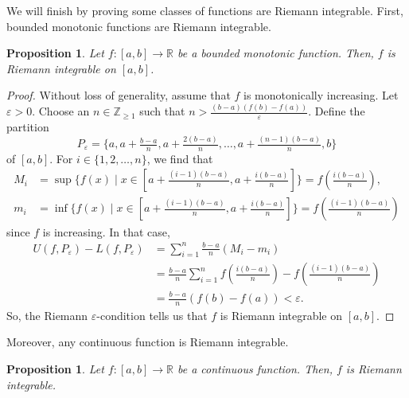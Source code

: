 \documentclass[a4paper, openany]{memoir}
\theoremstyle{definition}
\theoremstyle{plain}
\newtheorem{proposition}[definition]{Proposition}
\begin{document}
We will finish by proving some classes of functions are Riemann integrable. First, bounded monotonic functions are Riemann integrable.
\begin{proposition}
Let $f: [a, b] \to \mathbb{R}$ be a bounded monotonic function. Then, $f$ is Riemann integrable on $[a, b]$.
\end{proposition}
\begin{proof}
Without loss of generality, assume that $f$ is monotonically increasing. Let $\varepsilon > 0$. Choose an $n \in \mathbb{Z}_{\geqslant 1}$ such that $n > \frac{(b-a)(f(b) - f(a))}{\varepsilon}$. Define the partition
\[P_\varepsilon = \{a, a + \tfrac{b-a}{n}, a + \tfrac{2(b-a)}{n}, \dots, a + \tfrac{(n-1)(b-a)}{n}, b\}\]
of $[a, b]$. For $i \in \{1, 2, \dots, n\}$, we find that
\begin{align*}
    M_i &= \sup \{f(x) \mid x \in [a + \tfrac{(i-1)(b-a)}{n}, a + \tfrac{i(b-a)}{n}]\} = f(\tfrac{i(b-a)}{n}), \\
    m_i &= \inf \{f(x) \mid x \in [a + \tfrac{(i-1)(b-a)}{n}, a + \tfrac{i(b-a)}{n}]\} = f(\tfrac{(i-1)(b-a)}{n})
\end{align*}
since $f$ is increasing. In that case,
\begin{align*}
    U(f, P_\varepsilon) - L(f, P_\varepsilon) &= \sum_{i=1}^n \frac{b-a}{n} (M_i - m_i) \\
    &= \frac{b-a}{n} \sum_{i=1}^n f \left(\frac{i(b-a)}{n}\right) - f \left(\frac{(i-1)(b-a)}{n}\right) \\
    &= \frac{b-a}{n} (f(b) - f(a)) < \varepsilon.
\end{align*}
So, the Riemann $\varepsilon$-condition tells us that $f$ is Riemann integrable on $[a, b]$.
\end{proof}
\noindent Moreover, any continuous function is Riemann integrable.
\begin{proposition}
Let $f: [a, b] \to \mathbb{R}$ be a continuous function. Then, $f$ is Riemann integrable.
\end{proposition}
\end{document}
